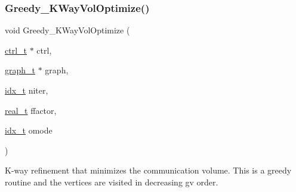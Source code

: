 \subsubsection{\texorpdfstring{Greedy\+\_\+\+K\+Way\+Vol\+Optimize()}{Greedy\_KWayVolOptimize()}}
{\footnotesize\ttfamily void Greedy\+\_\+\+K\+Way\+Vol\+Optimize (\begin{DoxyParamCaption}\item[{\hyperlink{a00742}{ctrl\+\_\+t} $\ast$}]{ctrl,  }\item[{\hyperlink{a00734}{graph\+\_\+t} $\ast$}]{graph,  }\item[{\hyperlink{a00876_aaa5262be3e700770163401acb0150f52}{idx\+\_\+t}}]{niter,  }\item[{\hyperlink{a00876_a1924a4f6907cc3833213aba1f07fcbe9}{real\+\_\+t}}]{ffactor,  }\item[{\hyperlink{a00876_aaa5262be3e700770163401acb0150f52}{idx\+\_\+t}}]{omode }\end{DoxyParamCaption})}

K-\/way refinement that minimizes the communication volume. This is a greedy routine and the vertices are visited in decreasing gv order.


